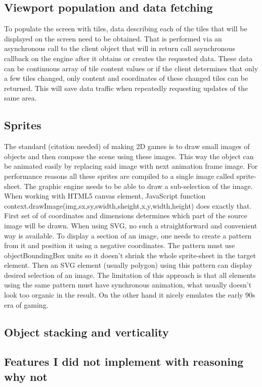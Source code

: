 \documentclass[11pt,oneside, final]{fithesis2}
\begin{document}
\subsection{Viewport population and data fetching}
To populate the screen with tiles, data describing each of the tiles that will be displayed on the screen need to be obtained. That is performed via an asynchronous call to the client object that will in return call asynchronous callback on the engine after it obtains or creates the requested data. These data can be continuous array of tile content values or if the client determines that only a few tiles changed, only content and coordinates of these changed tiles can be returned. This will save data traffic when repeatedly requesting updates of the same area.

\subsection{Sprites}
The standard (citation needed) of making 2D games is to draw small images of objects and then compose the scene using these images. This way the object can be animated easily by replacing said image with next animation frame image. For performance reasons all these sprites are compiled to a single image called sprite-sheet. The graphic engine needs to be able to draw a sub-selection of the image. When working with HTML5 canvas element, JavaScript function context.drawImage(img,sx,sy,swidth,sheight,x,y,width,height) does exactly that. First set of of coordinates and dimensions determines which part of the source image will be drawn. When using SVG, no such a straightforward and convenient way is available. To display a section of an image, one needs to create a pattern from it and position it using a negative coordinates. The pattern must use objectBoundingBox units so it doesn't shrink the whole sprite-sheet in the target element. Then an SVG element (usually polygon) using this pattern can display desired selection of an image.
The limitation of this approach is that all elements using the same pattern must have synchronous animation, what usually doesn't look too organic in the result. On the other hand it nicely emulates the early 90s era of gaming.

\subsection{Object stacking and verticality}

\subsection{Features I did not implement with reasoning why not}
\end{document}
